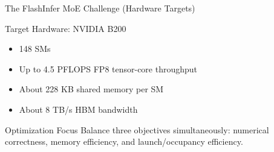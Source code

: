 \documentclass[aspectratio=169,11pt]{beamer}
\begin{document}
\begin{frame}[t]{The FlashInfer MoE Challenge (Hardware Targets)}
\small
\begin{block}{Target Hardware: NVIDIA B200}
\begin{itemize}
    \item 148 SMs
    \item Up to 4.5 PFLOPS FP8 tensor-core throughput
    \item About 228 KB shared memory per SM
    \item About 8 TB/s HBM bandwidth
\end{itemize}
\end{block}

\begin{exampleblock}{Optimization Focus}
Balance three objectives simultaneously: numerical correctness, memory efficiency,
and launch/occupancy efficiency.
\end{exampleblock}
\end{frame}
\end{document}
